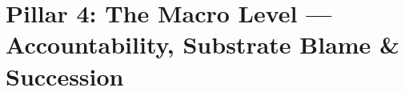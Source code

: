 \section{Pillar 4: The Macro Level --- Accountability, Substrate Blame \& Succession}
\label{sec:pillar4_macro}

